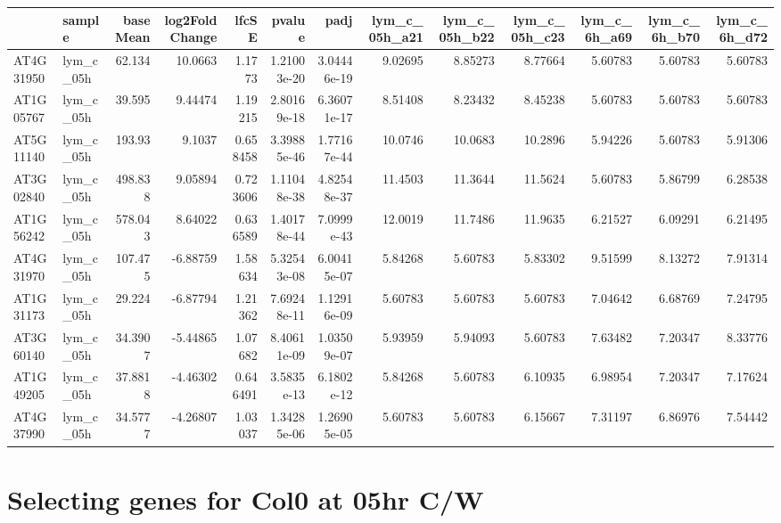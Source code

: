 \documentclass[11pt]{article}
\begin{document}
\begin{center}
\begin{tabular}{llrrrrrrrrrrr}
 & sample & baseMean & log2FoldChange & lfcSE & pvalue & padj & lym\_c\_05h\_a21 & lym\_c\_05h\_b22 & lym\_c\_05h\_c23 & lym\_c\_6h\_a69 & lym\_c\_6h\_b70 & lym\_c\_6h\_d72\\
\hline
AT4G31950 & lym\_c\_05h & 62.134 & 10.0663 & 1.1773 & 1.21003e-20 & 3.04446e-19 & 9.02695 & 8.85273 & 8.77664 & 5.60783 & 5.60783 & 5.60783\\
AT1G05767 & lym\_c\_05h & 39.595 & 9.44474 & 1.19215 & 2.80169e-18 & 6.36071e-17 & 8.51408 & 8.23432 & 8.45238 & 5.60783 & 5.60783 & 5.60783\\
AT5G11140 & lym\_c\_05h & 193.93 & 9.1037 & 0.658458 & 3.39885e-46 & 1.77167e-44 & 10.0746 & 10.0683 & 10.2896 & 5.94226 & 5.60783 & 5.91306\\
AT3G02840 & lym\_c\_05h & 498.838 & 9.05894 & 0.723606 & 1.11048e-38 & 4.82548e-37 & 11.4503 & 11.3644 & 11.5624 & 5.60783 & 5.86799 & 6.28538\\
AT1G56242 & lym\_c\_05h & 578.043 & 8.64022 & 0.636589 & 1.40178e-44 & 7.0999e-43 & 12.0019 & 11.7486 & 11.9635 & 6.21527 & 6.09291 & 6.21495\\
AT4G31970 & lym\_c\_05h & 107.475 & -6.88759 & 1.58634 & 5.32543e-08 & 6.00415e-07 & 5.84268 & 5.60783 & 5.83302 & 9.51599 & 8.13272 & 7.91314\\
AT1G31173 & lym\_c\_05h & 29.224 & -6.87794 & 1.21362 & 7.69248e-11 & 1.12916e-09 & 5.60783 & 5.60783 & 5.60783 & 7.04642 & 6.68769 & 7.24795\\
AT3G60140 & lym\_c\_05h & 34.3907 & -5.44865 & 1.07682 & 8.40611e-09 & 1.03509e-07 & 5.93959 & 5.94093 & 5.60783 & 7.63482 & 7.20347 & 8.33776\\
AT1G49205 & lym\_c\_05h & 37.8818 & -4.46302 & 0.646491 & 3.5835e-13 & 6.1802e-12 & 5.84268 & 5.60783 & 6.10935 & 6.98954 & 7.20347 & 7.17624\\
AT4G37990 & lym\_c\_05h & 34.5777 & -4.26807 & 1.03037 & 1.34285e-06 & 1.26905e-05 & 5.60783 & 5.60783 & 6.15667 & 7.31197 & 6.86976 & 7.54442\\
\end{tabular}
\end{center}
\section{Selecting genes for Col0 at 05hr C/W}
\label{sec:org2db8c38}
\end{document}
